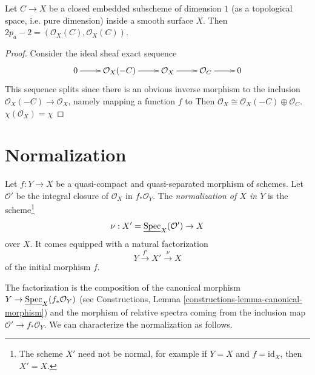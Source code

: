 \begin{exercise}
\label{exercise-genus-formula-for-curve-on-surface}
Let $C \to X$ be a closed embedded subscheme 
of dimension $1$ (as a topological space, i.e. pure dimension)
inside a smooth surface $X$.
Then $2p_a-2=(\mathcal{O}_X(C),\mathcal{O}_X(C))$.
\end{exercise}

\begin{proof}
Consider the ideal sheaf exact sequence
$$
\xymatrix{
0\ar[r]&\mathcal{O}_X(-C)\ar[r]&\mathcal{O}_X\ar[r]&\mathcal{O}_C\ar[r]&0
}
$$
This sequence splits since there is an obvious inverse morphism
to the inclusion $\mathcal{O}_X(-C)\to \mathcal{O}_X$, namely
mapping a function $f$ to 
Then $\mathcal{O}_X\cong \mathcal{O}_X(-C) \oplus \mathcal{O}_C$.
 $\chi(\mathcal{O}_X)=\chi$
\end{proof}

\section{Normalization}
\label{section-normalization}

\begin{definition}
\label{definition-normalization-X-in-Y}
Let $f : Y \to X$ be a quasi-compact and quasi-separated morphism of schemes.
Let $\mathcal{O}'$ be the integral closure of $\mathcal{O}_X$ in
$f_*\mathcal{O}_Y$. The {\it normalization of $X$ in $Y$} is the
scheme\footnote{The scheme $X'$ need not be normal, for example if
$Y = X$ and $f = \text{id}_X$, then $X' = X$.}
$$
\nu : X' = \underline{\mathop{\mathrm{Spec}}}_X(\mathcal{O}') \to X
$$
over $X$. It comes equipped with a natural factorization
$$
Y \xrightarrow{f'} X' \xrightarrow{\nu} X
$$
of the initial morphism $f$.
\end{definition}

\noindent
The factorization is the composition of the canonical morphism
$Y \to \underline{\mathop{\mathrm{Spec}}}_X(f_*\mathcal{O}_Y)$ (see
Constructions, Lemma
\ref{constructions-lemma-canonical-morphism})
and the morphism of relative spectra coming from the inclusion map
$\mathcal{O}' \to f_*\mathcal{O}_Y$. We can characterize the
normalization as follows.

